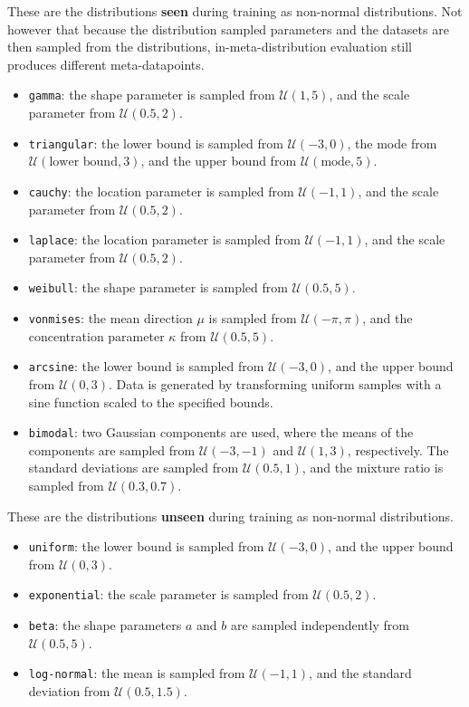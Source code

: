 These are the distributions \textbf{seen} during training as non-normal distributions. Not however that because the distribution sampled parameters and the datasets are then sampled from the distributions, in-meta-distribution evaluation still produces different meta-datapoints.
\begin{itemize}
    \item \texttt{gamma}: the shape parameter is sampled from $\mathcal{U}(1, 5)$, and the scale parameter from $\mathcal{U}(0.5, 2)$.
    \item \texttt{triangular}: the lower bound is sampled from $\mathcal{U}(-3, 0)$, the mode from $\mathcal{U}(\text{lower bound}, 3)$, and the upper bound from $\mathcal{U}(\text{mode}, 5)$.
    \item \texttt{cauchy}: the location parameter is sampled from $\mathcal{U}(-1, 1)$, and the scale parameter from $\mathcal{U}(0.5, 2)$.
    \item \texttt{laplace}: the location parameter is sampled from $\mathcal{U}(-1, 1)$, and the scale parameter from $\mathcal{U}(0.5, 2)$.
    \item \texttt{weibull}: the shape parameter is sampled from $\mathcal{U}(0.5, 5)$.
    \item \texttt{vonmises}: the mean direction $\mu$ is sampled from $\mathcal{U}(-\pi, \pi)$, and the concentration parameter $\kappa$ from $\mathcal{U}(0.5, 5)$.
    \item \texttt{arcsine}: the lower bound is sampled from $\mathcal{U}(-3, 0)$, and the upper bound from $\mathcal{U}(0, 3)$. Data is generated by transforming uniform samples with a sine function scaled to the specified bounds.
    \item \texttt{bimodal}: two Gaussian components are used, where the means of the components are sampled from $\mathcal{U}(-3, -1)$ and $\mathcal{U}(1, 3)$, respectively. The standard deviations are sampled from $\mathcal{U}(0.5, 1)$, and the mixture ratio is sampled from $\mathcal{U}(0.3, 0.7)$.
\end{itemize}

These are the distributions \textbf{unseen} during training as non-normal distributions.
\begin{itemize}
    \item \texttt{uniform}: the lower bound is sampled from $\mathcal{U}(-3, 0)$, and the upper bound from $\mathcal{U}(0, 3)$.
    \item \texttt{exponential}: the scale parameter is sampled from $\mathcal{U}(0.5, 2)$.
    \item \texttt{beta}: the shape parameters $a$ and $b$ are sampled independently from $\mathcal{U}(0.5, 5)$.
    \item \texttt{log-normal}: the mean is sampled from $\mathcal{U}(-1, 1)$, and the standard deviation from $\mathcal{U}(0.5, 1.5)$.
\end{itemize}

